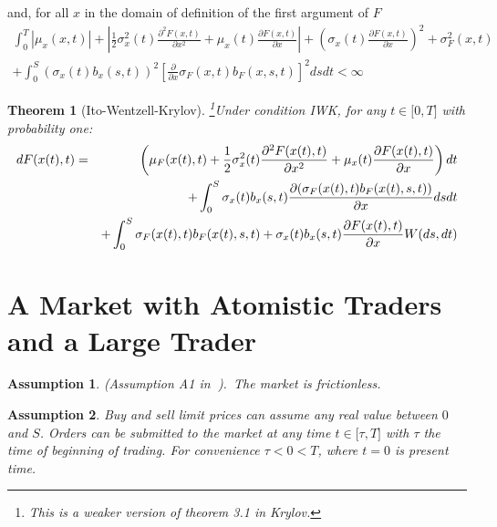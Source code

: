 \documentclass{article}
\newtheorem{theorem}{Theorem}[section]
\newtheorem{assumption}{Assumption}
\begin{document}
\qquad and, for all $x$ in the domain of definition of the first argument of
$F$%
\begin{gather*}
\int_{0}^{T}|\mu _{x}(x,t)|+|\frac{1}{2}\sigma _{x}^{2}(t)\frac{\partial
^{2}F(x,t)}{\partial x^{2}}+\mu _{x}(t)\frac{\partial F(x,t)}{\partial x}%
|+\left( \sigma _{x}(t)\frac{\partial F(x,t)}{\partial x}\right) ^{2}+\sigma
_{F}^{2}(x,t) \\
+\int_{0}^{S}(\sigma _{x}(t)b_{x}(s,t))^{2}[\frac{\partial }{\partial x}%
\sigma _{F}(x,t)b_{F}(x,s,t)]^{2}dsdt<\infty
\end{gather*}


\begin{theorem}[Ito-Wentzell-Krylov]
\footnote{%
This is a weaker version of theorem 3.1 in Krylov.}Under condition IWK, for
any $t\in \lbrack 0,T]$ with probability one:%
\begin{eqnarray}
dF(x(t),t) &=&\left( \mu _{F}(x(t),t)+\frac{1}{2}\sigma _{x}^{2}(t)\frac{%
\partial ^{2}F(x(t),t)}{\partial x^{2}}+\mu _{x}(t)\frac{\partial F(x(t),t)}{%
\partial x}\right) dt  \label{ItoWentzell} \\
&&+\int_{0}^{S}\sigma _{x}(t)b_{x}(s,t)\frac{\partial (\sigma
_{F}(x(t),t)b_{F}(x(t),s,t))}{\partial x}dsdt  \notag \\
&&+\int_{0}^{S}\sigma _{F}(x(t),t)b_{F}(x(t),s,t)+\sigma _{x}(t)b_{x}(s,t)%
\frac{\partial F(x(t),t)}{\partial x}W(ds,dt)  \notag
\end{eqnarray}
\end{theorem}

\section{A Market with Atomistic Traders and a Large Trader}


\begin{assumption}
\label{ass::market_frictionless} (Assumption A1 in\textbf{\ }\cite{Jar92}).\
The market is frictionless.
\end{assumption}



\begin{assumption}
Buy and sell limit prices can assume any real value between $0$ and $S$.
Orders can be submitted to the market at any time $t\in \mathbb{[\tau },T]$
with $\tau $ the time of beginning of trading. For convenience $\tau <0<T$,
where $t=0$ is present time.
\end{assumption}
\end{document}
